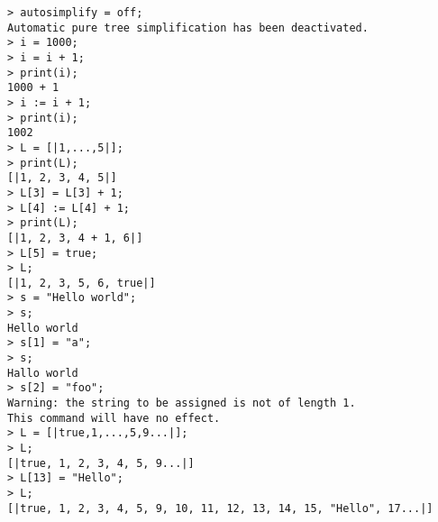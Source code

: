 \begin{center}\begin{minipage}{15cm}\begin{Verbatim}[frame=single]
> autosimplify = off;
Automatic pure tree simplification has been deactivated.
> i = 1000;
> i = i + 1;
> print(i);
1000 + 1
> i := i + 1;
> print(i);
1002
> L = [|1,...,5|];
> print(L);
[|1, 2, 3, 4, 5|]
> L[3] = L[3] + 1;
> L[4] := L[4] + 1;
> print(L);
[|1, 2, 3, 4 + 1, 6|]
> L[5] = true;
> L;
[|1, 2, 3, 5, 6, true|]
> s = "Hello world";
> s;
Hello world
> s[1] = "a";
> s;
Hallo world
> s[2] = "foo";
Warning: the string to be assigned is not of length 1.
This command will have no effect.
> L = [|true,1,...,5,9...|];
> L;
[|true, 1, 2, 3, 4, 5, 9...|]
> L[13] = "Hello";
> L;
[|true, 1, 2, 3, 4, 5, 9, 10, 11, 12, 13, 14, 15, "Hello", 17...|]
\end{Verbatim}
\end{minipage}\end{center}
